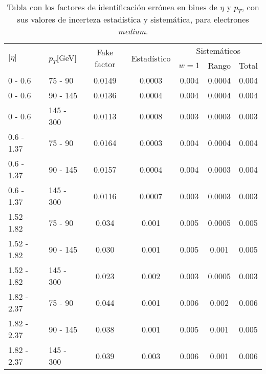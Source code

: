 \begin{table}	
\centering
\caption{Tabla con los factores de identificación errónea en bines de $\eta$ y $p_{T}$, con sus valores de incerteza estadística y sistemática, para electrones \textit{medium}.}
\begin{threeparttable}
\begin{tabular}{ l l c c c c c }

	\hline
	\hline

	\multirow{2}{*}{$|\eta|$} & \multirow{2}{*}{$p_{T}$[GeV]} & \multirow{2}{*}{Fake factor} & \multirow{2}{*}{Estadístico} & \multicolumn{3}{c}{Sistemáticos}  \\

	\cline{5-7}

	 		& & & 	& $w=1$ & Rango & Total \\


	\hline

	0 - 0.6 	& 75 - 90 	& 0.0149 & 0.0003 & 0.004	&  0.0004	&  0.004  \\

	0 - 0.6 	& 90 - 145 	& 0.0136 & 0.0004 & 0.004	&  0.0004	&  0.004  \\

	0 - 0.6 	& 145 - 300 & 0.0113 & 0.0008 & 0.003	&  0.0003	&  0.003  \\

	\hline

	0.6 - 1.37 	& 75 - 90 	& 0.0164 & 0.0003 & 0.004	&  0.0004	&  0.004  \\

	0.6 - 1.37 	& 90 - 145 	& 0.0157 & 0.0004 & 0.004	&  0.0003	&  0.004  \\

	0.6 - 1.37 	& 145 - 300 & 0.0116 & 0.0007 & 0.003	&  0.0003	&  0.003  \\

	\hline

	1.52 - 1.82 & 75 - 90 	& 0.034  & 0.001 & 0.005	&  0.0005	&  0.005 \\

	1.52 - 1.82 & 90 - 145 	& 0.030  & 0.001 & 0.005	&  0.001	&  0.005  \\

	1.52 - 1.82 & 145 - 300 & 0.023  & 0.002 & 0.003	&  0.0005	&  0.003  \\

	\hline

	1.82 - 2.37 & 75 - 90 	& 0.044		& 0.001 & 0.006	&  0.002	&  0.006  \\

	1.82 - 2.37 & 90 - 145	& 0.038		& 0.001 & 0.005	&  0.001	&  0.005  \\

	1.82 - 2.37 & 145 - 300 & 0.039		& 0.003 & 0.006	&  0.001	&  0.006  \\

	\hline
	\hline

\end{tabular}
\end{threeparttable}
\label{ta:fftable_medium}
\end{table}

